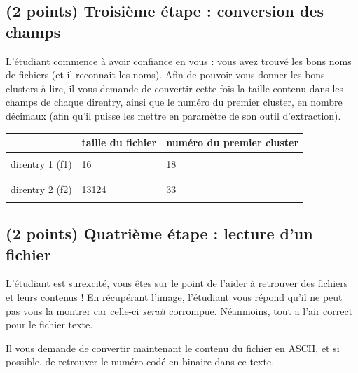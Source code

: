 \documentclass[11pt,a4paper]{article}
\begin{document}

\newpage

\subsection{(2 points) Troisième étape : conversion des champs }

L'étudiant commence à avoir confiance en vous : vous avez trouvé les bons noms de fichiers (et il reconnait les noms).
Afin de pouvoir vous donner les bons clusters à lire, il vous demande de convertir cette fois la taille contenu dans les champs de chaque direntry, ainsi que le numéro du premier cluster, en nombre décimaux (afin qu'il puisse les mettre en paramètre de son outil d'extraction).

\smallskip

\begin{center}
\begin{tabular}{ | c | C{5cm} | C{7.5cm} | }
\hline
 & taille du fichier & numéro du premier cluster \\
\hline
 & & \\
direntry 1 (f1) &  16  &  18  \\
 & & \\
\hline
 & & \\
direntry 2 (f2) &  13124  &  33  \\
 & & \\
\hline
\end{tabular}
\end{center}

\smallskip

\subsection{(2 points) Quatrième étape : lecture d'un fichier }

L'étudiant est surexcité, vous êtes sur le point de l'aider à retrouver des fichiers et leurs contenus !
En récupérant l'image, l'étudiant vous répond qu'il ne peut pas vous la montrer car celle-ci \textit{serait} corrompue.
Néanmoins, tout a l'air correct pour le fichier texte.

\smallskip

Il vous demande de convertir maintenant le contenu du fichier en ASCII, et si possible, de retrouver le numéro codé en binaire dans ce texte.
\end{document}
